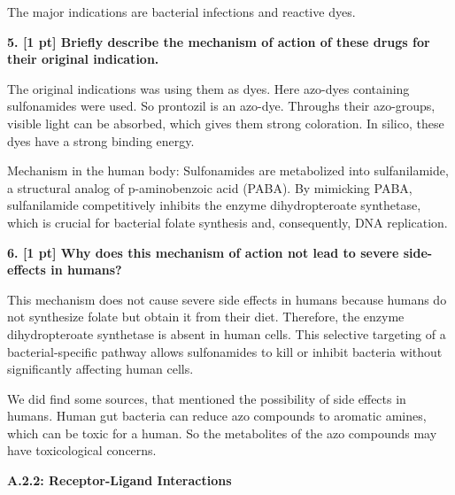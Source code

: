 \documentclass[a4paper,10pt]{article}
\begin{document}
The major indications are bacterial infections and reactive dyes. 

\textbf{5. [1 pt] Briefly describe the mechanism of action of these drugs for their original indication.}

The original indications was using them as dyes. Here azo-dyes containing sulfonamides were used. So prontozil is an azo-dye. Throughs their azo-groups, visible light can be absorbed, which gives them strong coloration. In silico, these dyes have a strong binding energy. \cite{Nayaka2024}

Mechanism in the human body: Sulfonamides are metabolized into sulfanilamide, a structural analog of p-aminobenzoic acid (PABA). By mimicking PABA, sulfanilamide competitively inhibits the enzyme dihydropteroate synthetase, which is crucial for bacterial folate synthesis and, consequently, DNA replication. \cite{sulfonamide}

\textbf{6. [1 pt] Why does this mechanism of action not lead to severe side-eﬀects in humans?}

This mechanism does not cause severe side effects in humans because humans do not synthesize folate but obtain it from their diet. Therefore, the enzyme dihydropteroate synthetase is absent in human cells. This selective targeting of a bacterial-specific pathway allows sulfonamides to kill or inhibit bacteria without significantly affecting human cells. \cite{Dihydropteroatesynthase}

We did find some sources, that mentioned the possibility of side effects in humans. Human gut bacteria can reduce azo compounds to aromatic amines, which can be toxic for a human. So the metabolites of the azo compounds may have toxicological concerns. \cite{Josephy2023}

\begin{large}
	\vspace{1.0cm}
	\textbf{A.2.2: Receptor-Ligand Interactions}
\end{large}	\\ [2mm]
\end{document}
